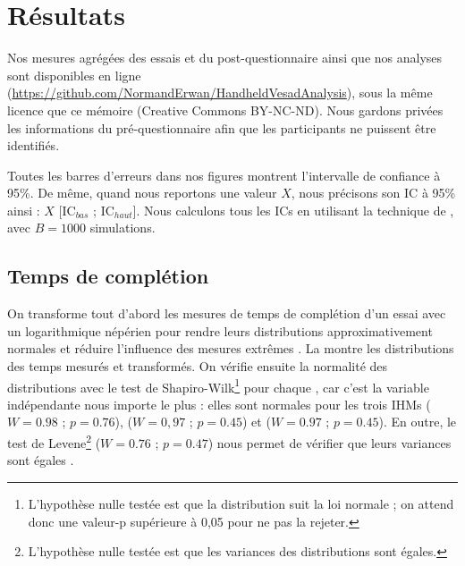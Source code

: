 \section{Résultats}
\label{sec:experiment_results}

Nos mesures agrégées des essais et du post-questionnaire ainsi que nos analyses sont disponibles en ligne (\url{https://github.com/NormandErwan/HandheldVesadAnalysis}), sous la même licence que ce mémoire (Creative Commons BY-NC-ND). Nous gardons privées les informations du pré-questionnaire afin que les participants ne puissent être identifiés.

Toutes les barres d'erreurs dans nos figures montrent l'intervalle de confiance à 95\%. De même, quand nous reportons une valeur $X$, nous précisons son IC à 95\% ainsi : $X$ [$\text{IC}_{bas}$ ; $\text{IC}_{haut}$]. Nous calculons tous les ICs en utilisant la technique de  \citep[p. 25]{Dragicevic2016}, avec $B=1000$ simulations.

\subsection{Temps de complétion}
\label{subsec:experiment_results_time}


On transforme tout d'abord les mesures de temps de complétion d'un essai avec un logarithmique népérien pour rendre leurs distributions approximativement normales et réduire l'influence des mesures extrêmes \citep[p. 25]{Dragicevic2016}. La  montre les distributions des temps mesurés et transformés. On vérifie ensuite la normalité des distributions avec le test de Shapiro-Wilk\footnote{L'hypothèse nulle testée est que la distribution suit la loi normale ; on attend donc une valeur-p supérieure à 0,05 pour ne pas la rejeter.} \citep{Wobbrock2016} pour chaque , car c'est la variable indépendante nous importe le plus : elles sont normales pour les trois IHMs  ($W = \num{0.98}$ ; $p = \num{0.76}$),  ($W = 0,97$ ; $p = \num{0.45}$) et  ($W = \num{0.97}$ ; $p = \num{0.45}$). En outre, le test de Levene\footnote{L'hypothèse nulle testée est que les variances des distributions sont égales.} ($W = \num{0.76}$ ; $p = \num{0.47}$) nous permet de vérifier que leurs variances sont égales \citep{Wobbrock2016}.

